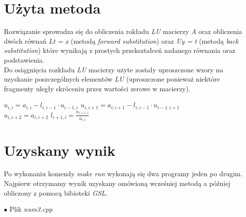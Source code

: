 \documentclass{article}
\begin{document}
  \section{Użyta metoda}
  Rozwiązanie sprowadza się do obliczenia rokładu \textit{LU} macierzy \textit{A} oraz obliczenia dwóch równań \textit{Lt = x} (metodą \textit{forward substitution}) oraz \textit{Uy = t} (metodą \textit{back substitution}) które wynikają z prostych przekształceń zadanego równania oraz podstawienia.\\
  Do osiągnięcia rozkładu \textit{LU} macierzy użyte zostały uproszczone wzory na uzyskanie poszczególnych elementów \textit{LU} (uproszczone ponieważ niektóre fragmenty uległy skróceniu przez wartości zerowe w macierzy).
  \begin{center}
    {\Large $u_{i,i} = a_{i,i} - l_{i,i-1} \cdot u_{i-1,i}$} \qquad \qquad
    {\Large $u_{i,i+1} = a_{i,i+1} - l_{i,i-1} \cdot u_{i-1,i+1}$} \\
    {\Large $u_{i,i+2} = a_{i,i+2}$} \qquad \qquad
    {\Large $l_{i+1,i} = \frac{a_{i+1,i}}{u_{i,i}}$}
  \end{center}

  \section{Uzyskany wynik}
  Po wykonaniu komendy \textit{make run} wykonają się dwa programy jeden po drugim. Najpierw otrzymamy wynik uzyskany omówioną wcześniej metodą a później obliczony z pomocą bibioteki \textit{GSL}.
    \begin{flushleft}
      $\bullet$ Plik \textit{num3.cpp}
    \end{flushleft}
\end{document}
